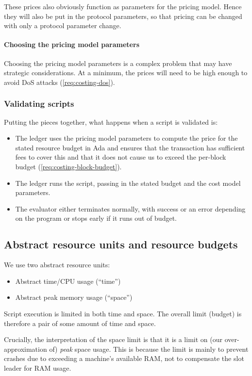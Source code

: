 These prices also obviously function as parameters for the pricing model.
Hence they will also be put in the protocol parameters, so that pricing can be changed with only a protocol parameter change.

\paragraph{Choosing the pricing model parameters}
Choosing the pricing model parameters is a complex problem that may have strategic considerations.
At a minimum, the prices will need to be high enough to avoid DoS attacks (\cref{req:costing-dos}).

\subsubsection{Validating scripts}
Putting the pieces together, what happens when a script is validated is:
\begin{itemize}
\item
  The ledger uses the pricing model parameters to compute the price for the stated resource budget in Ada and ensures that the transaction has sufficient fees to cover this and that it does not cause us to exceed the per-block budget (\cref{req:costing-block-budget}).
\item
  The ledger runs the script, passing in the stated budget and the cost model parameters.
\item
  The evaluator either terminates normally, with success or an error depending on the program or stops early if it runs out of budget.
\end{itemize}

\subsection{Abstract resource units and resource budgets}
\label{sec:costing-units}
We use two abstract resource units:
\begin{itemize}
\item Abstract time/CPU usage (``\gls{time}'')
\item Abstract peak memory usage (``\gls{space}'')
\end{itemize}

Script execution is limited in both \gls{time} and \gls{space}.
The overall limit (budget) is therefore a pair of some amount of \gls{time} and \gls{space}.

Crucially, the interpretation of the \gls{space} limit is that it is a limit on (our over-approximation of) \emph{peak} space usage.
This is because the limit is mainly to prevent crashes due to exceeding a machine's available RAM, not to compensate the slot leader for RAM usage.

